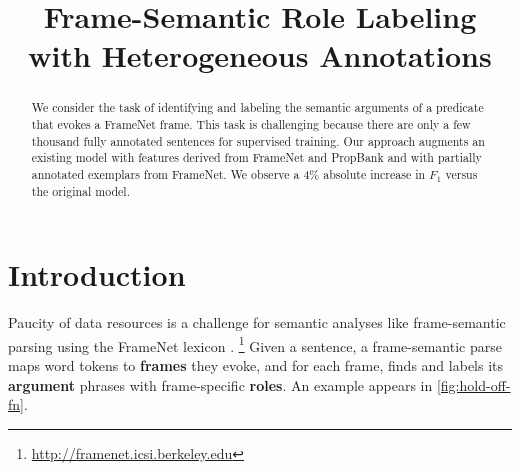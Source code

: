 \documentclass[11pt,a4paper]{article}
\title{Frame-Semantic Role Labeling with Heterogeneous Annotations}
\newcommand{\ensuretext}[1]{#1}
\newcommand{\nssmarker}{\ensuretext{\textcolor{magenta}{\ensuremath{^{\textsc{NS}}_{\textsc{S}}}}}}
\newcommand{\mkmarker}{\ensuretext{\textcolor{red}{\ensuremath{^{\textsc{M}}_{\textsc{K}}}}}}
\newcommand{\stmarker}{\ensuretext{\textcolor{orange}{\ensuremath{^{\textsc{S}}_{\textsc{T}}}}}}
\newcommand{\arkcomment}[3]{\ensuretext{\textcolor{#3}{[#1 #2]}}}
\newcommand{\nss}[1]{\arkcomment{\nssmarker}{#1}{magenta}}
\newcommand{\mk}[1]{\arkcomment{\mkmarker}{#1}{red}}
\newcommand{\st}[1]{\arkcomment{\stmarker}{#1}{orange}}
\begin{document}
\maketitle
\begin{abstract}
We consider the task of identifying and labeling the semantic
arguments of a predicate that evokes a FrameNet frame.  This task is
challenging because there are only a few thousand fully annotated
sentences for supervised training.  Our approach augments an existing %
model with features derived from FrameNet and PropBank and with
partially annotated exemplars from FrameNet.  We observe a 4\% absolute increase in $F_1$ 
versus the original model.

\end{abstract}

\section{Introduction}

Paucity of data resources is a challenge for semantic analyses like
frame-semantic parsing \citep{gildea-02,das-14} using the
FrameNet lexicon \citep{baker-98,fillmore_frames_2010}.%
\footnote{\url{http://framenet.icsi.berkeley.edu}}
Given a sentence, a frame-semantic parse maps word tokens
to \textbf{frames} they evoke, and for each frame, finds and labels
its \textbf{argument} phrases  
with frame-specific \textbf{roles}. 
An example appears in \cref{fig:hold-off-fn}. %
\end{document}
